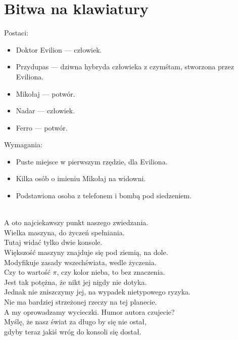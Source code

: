 \chapter{Bitwa na klawiatury} 

Postaci:
\begin{itemize}
	\item Doktor Evilion --- człowiek.
	\item Przydupas --- dziwna hybryda człowieka z czymśtam, stworzona przez Eviliona.
	\item Mikołaj --- potwór.
	\item Nadar --- człowiek.
	\item Ferro --- potwór.
\end{itemize}
Wymagania:
\begin{itemize}
	\item Puste miejsce w pierwszym rzędzie, dla Eviliona.
	\item Kilka osób o imieniu Mikołaj na widowni.
	\item Podstawiona osoba z telefonem i bombą pod siedzeniem.
\end{itemize}


\\

\charnad{}
A oto najciekawszy punkt naszego zwiedzania.\\
Wielka maszyna, do życzeń spełniania.\\
Tutaj widać tylko dwie konsole.\\
Większość maszyny znajduje się pod ziemią, na dole.\\
Modyfikuje zasady wszechświata, wedle życzenia.\\
Czy to wartość $\pi$, czy kolor nieba, to bez znaczenia.\\
Jest tak potężna, że nikt jej nigdy nie dotyka.\\
Jednak nie zniszczymy jej, na wypadek nietypowego ryzyka.\\
Nie ma bardziej strzeżonej rzeczy na tej planecie.\\
A my oprowadzamy wycieczki. Humor autora czujecie?\\
Myślę, że nasz świat za długo by się nie ostał,\\
gdyby teraz jakiś wróg do konsoli się dostał.\\

